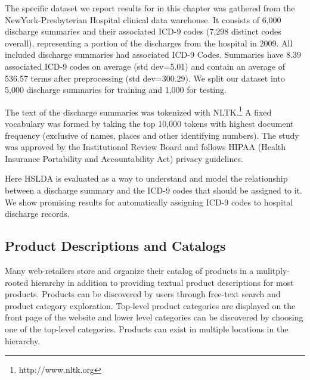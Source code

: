 The specific dataset we report results for in this chapter was gathered from the NewYork-Presbyterian Hospital clinical data warehouse. 
It consists of 6,000 discharge summaries and
their associated ICD-9 codes (7,298 distinct codes overall), representing a portion of
the discharges from the hospital in 2009. All included discharge summaries had associated ICD-9 Codes.
Summaries have 8.39 associated ICD-9
codes on average (std dev=5.01) and contain an average of 536.57 terms after
preprocessing (std dev=300.29). We split our dataset into 5,000 discharge
summaries for training and 1,000 for testing.

The text of the discharge summaries was tokenized with
NLTK.\footnote{http://www.nltk.org} A fixed vocabulary was formed by taking
the top 10,000 tokens with highest document frequency (exclusive of names,
places and other identifying numbers). The study was approved
by the Institutional Review Board and follows HIPAA (Health
Insurance Portability and Accountability Act) privacy guidelines.

Here HSLDA is evaluated as a way to understand and model the relationship between a discharge summary and the ICD-9 codes that should be assigned to it.  We show promising results for automatically assigning ICD-9 codes to hospital discharge records.  


\subsection{Product Descriptions and Catalogs}

Many web-retailers store and organize their catalog of products in a
mulitply-rooted hierarchy in addition to providing textual product descriptions 
for most products. Products can be discovered by users
through free-text search and product category exploration. Top-level
product categories are displayed on the front page of the website and lower
level categories can be discovered by choosing one of the top-level categories.
Products can exist in multiple locations in the hierarchy.


